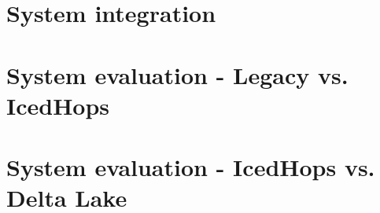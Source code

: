 

\section{System integration}
  \label{sec:system_integration}
  

\section{System evaluation - Legacy vs. IcedHops}
  \label{sec:system_evaluation_hudi_iceberg}
  

\section{System evaluation - IcedHops vs. Delta Lake}
  \label{sec:system_evaluation_iceberg_delta}
  